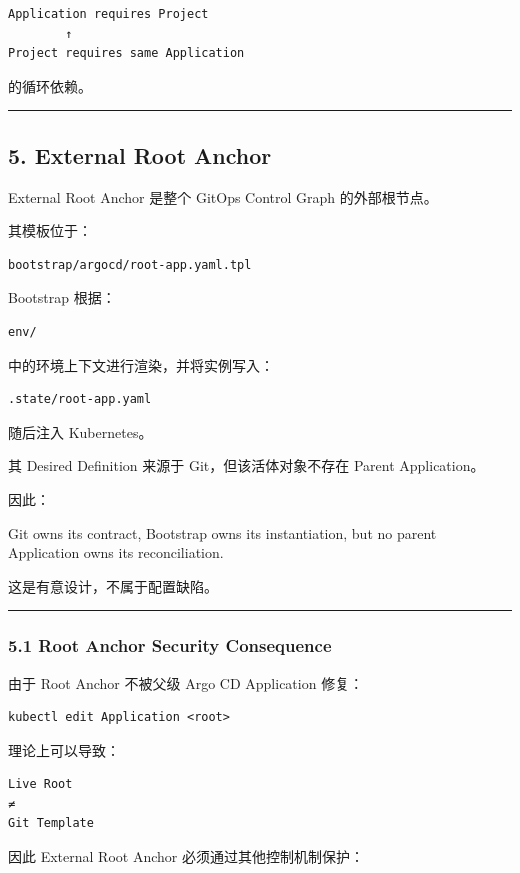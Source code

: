 \documentclass[11pt,a4paper]{article}
\begin{document}
\begin{lstlisting}[language=text]
Application requires Project
        ↑
Project requires same Application
\end{lstlisting}
的循环依赖。

\vspace{0.5em}\hrule\vspace{0.5em}
\subsection{5. External Root Anchor}
External Root Anchor 是整个 GitOps Control Graph 的外部根节点。

其模板位于：

\begin{lstlisting}[language=text]
bootstrap/argocd/root-app.yaml.tpl
\end{lstlisting}
Bootstrap 根据：

\begin{lstlisting}[language=text]
env/
\end{lstlisting}
中的环境上下文进行渲染，并将实例写入：

\begin{lstlisting}[language=text]
.state/root-app.yaml
\end{lstlisting}
随后注入 Kubernetes。

其 Desired Definition 来源于 Git，但该活体对象不存在 Parent Application。

因此：

\begin{gfmBlockquote}
Git owns its contract, Bootstrap owns its instantiation, but no parent Application owns its reconciliation.
\end{gfmBlockquote}
这是有意设计，不属于配置缺陷。

\vspace{0.5em}\hrule\vspace{0.5em}
\subsubsection{5.1 Root Anchor Security Consequence}
由于 Root Anchor 不被父级 Argo CD Application 修复：

\begin{lstlisting}[language=text]
kubectl edit Application <root>
\end{lstlisting}
理论上可以导致：

\begin{lstlisting}[language=text]
Live Root
≠
Git Template
\end{lstlisting}
因此 External Root Anchor 必须通过其他控制机制保护：
\end{document}
